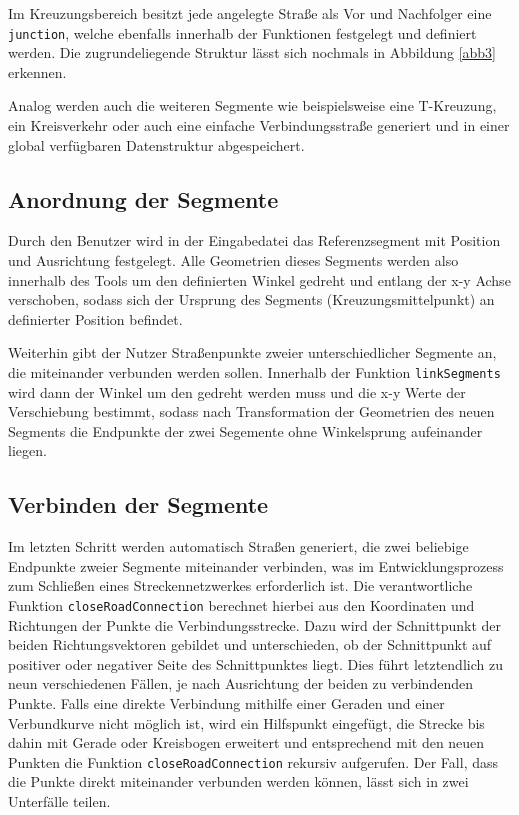 Im Kreuzungsbereich besitzt jede angelegte Straße als Vor und Nachfolger eine \texttt{junction}, welche ebenfalls innerhalb der Funktionen festgelegt und definiert werden. Die zugrundeliegende Struktur lässt sich nochmals in Abbildung \ref{abb3} erkennen.

Analog werden auch die weiteren Segmente wie beispielsweise eine T-Kreuzung, ein Kreisverkehr oder auch eine einfache Verbindungsstraße generiert und in einer global verfügbaren Datenstruktur abgespeichert.

\subsection{Anordnung der Segmente}

Durch den Benutzer wird in der Eingabedatei das Referenzsegment mit Position und Ausrichtung festgelegt. Alle Geometrien dieses Segments werden also innerhalb des Tools um den definierten Winkel gedreht und entlang der x-y Achse verschoben, sodass sich der Ursprung des Segments (Kreuzungsmittelpunkt) an definierter Position befindet.

Weiterhin gibt der Nutzer Straßenpunkte zweier unterschiedlicher Segmente an, die miteinander verbunden werden sollen. Innerhalb der Funktion \texttt{linkSegments} wird dann der Winkel um den gedreht werden muss und die x-y Werte der Verschiebung bestimmt, sodass nach Transformation der Geometrien des neuen Segments die Endpunkte der zwei Segemente ohne Winkelsprung aufeinander liegen.

\subsection{Verbinden der Segmente}

Im letzten Schritt werden automatisch Straßen generiert, die zwei beliebige Endpunkte zweier Segmente miteinander verbinden, was im Entwicklungsprozess zum Schließen eines Streckennetzwerkes erforderlich ist. Die verantwortliche Funktion \texttt{closeRoadConnection} berechnet hierbei aus den Koordinaten und Richtungen der Punkte die Verbindungsstrecke. Dazu wird der Schnittpunkt der beiden Richtungsvektoren gebildet und unterschieden, ob der Schnittpunkt auf positiver oder negativer Seite des Schnittpunktes liegt. Dies führt letztendlich zu neun verschiedenen Fällen, je nach Ausrichtung der beiden zu verbindenden Punkte. Falls eine direkte Verbindung mithilfe einer Geraden und einer Verbundkurve nicht möglich ist, wird ein Hilfspunkt eingefügt, die Strecke bis dahin mit Gerade oder Kreisbogen erweitert und entsprechend mit den neuen Punkten die Funktion \texttt{closeRoadConnection} rekursiv aufgerufen. Der Fall, dass die Punkte direkt miteinander verbunden werden können, lässt sich in zwei Unterfälle teilen.

